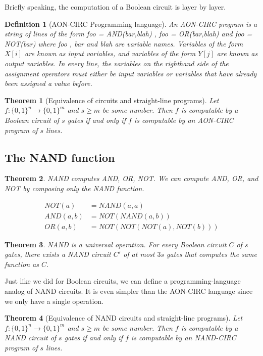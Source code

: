 \documentclass[aps,pra,onecolumn,notitlepage,superscriptaddress]{revtex4-1}
\newtheorem{theo}{Theorem}
\newtheorem{defi}{Definition}
\begin{document}
    Briefly speaking, the computation of a Boolean circuit is layer by layer.

    \begin{defi} [AON-CIRC Programming language]
        An AON-CIRC program is a string of lines of the form foo = AND(bar,blah) , foo = OR(bar,blah) and foo = NOT(bar) where foo , bar and blah are variable names. Variables of the form $X[i]$ are known as input variables, and variables of the form $Y[j]$ are known as output variables. In every line, the variables on the righthand side of the assignment operators must either be input variables or variables that have already been assigned a value before.
    \end{defi}

    \begin{theo}[Equivalence of circuits and straight-line programs]
        Let $f: \{0,1\}^n \rightarrow \{0,1\}^m$ and $s \geq m$ be some number. Then $f$ is
        computable by a Boolean circuit of $s$ gates if and only if $f$ is computable by an AON-CIRC program of $s$ lines.
    \end{theo}

    \subsection{The NAND function}
    \begin{theo}
        NAND computes AND, OR, NOT. We can compute AND, OR, and NOT by composing only the NAND function.
    \end{theo}
    \begin{align*}
        NOT(a) &= NAND(a,a) \\
        AND(a,b) &= NOT(NAND(a,b)) \\
        OR(a,b) &= NOT(NOT(NOT(a),NOT(b)))
    \end{align*}

    \begin{theo}
        NAND is a universal operation. For every Boolean circuit $C$ of $s$ gates, there exists a NAND circuit $C'$ of at most $3s$ gates that computes the same function as $C$.
    \end{theo}

    Just like we did for Boolean circuits, we can define a programming-language analog of NAND circuits. It is even simpler than the AON-CIRC language since we only have a single operation. 

    \begin{theo}[Equivalence of NAND circuits and straight-line programs]
        Let $f: \{0,1\}^n \rightarrow \{0,1\}^m$ and $s \geq m$ be some number. Then $f$ is
        computable by a NAND circuit of $s$ gates if and only if $f$ is computable by an NAND-CIRC program of $s$ lines.
    \end{theo}
\end{document}
